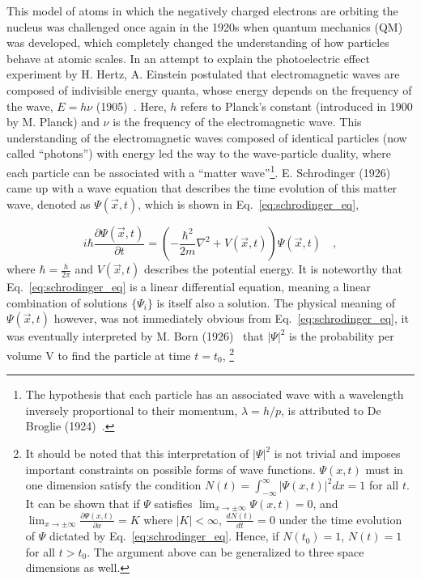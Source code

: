 This model of atoms in which the negatively charged electrons are orbiting the nucleus 
was challenged once again in the 1920s when quantum mechanics (QM) was developed, which completely 
changed the understanding of how particles behave at atomic scales. 
In an attempt to explain the photoelectric effect experiment by H. Hertz,
A. Einstein postulated that electromagnetic waves are composed of indivisible energy quanta, whose energy depends on the
frequency of the wave, $E = h\nu$ (1905)~\cite{Einstein:1905cc}. 
Here, $h$ refers to Planck's constant (introduced in 1900 by M. Planck) and $\nu$
is the frequency of the electromagnetic wave. This understanding of the electromagnetic waves composed of identical 
particles (now called ``photons'') with energy led the way to the wave-particle duality, 
where each particle can be associated with a 
``matter wave''\footnote{The hypothesis that each particle has an associated wave with a wavelength inversely
proportional to their momentum, $\lambda = h / p$, is attributed to De Broglie (1924)~\cite{deBroglie:1924ldk}.}. 
E. Schrodinger (1926)~\cite{Schrodinger:1926gei} 
came up with a wave equation that describes the time evolution of this matter wave, denoted as $\Psi(\vec{x}, t)$, 
which is shown in Eq.~\ref{eq:schrodinger_eq},

\begin{equation}
    i\hbar\frac{\partial \Psi(\vec{x}, t)}{\partial t} = \left(- \frac{\hbar^2}{2m}\nabla^2 + V(\vec{x}, t) \right)\Psi(\vec{x}, t) \quad ,
    \label{eq:schrodinger_eq}
\end{equation}
where $\hbar = \frac{h}{2\pi}$ and $V(\vec{x}, t)$ describes the potential energy. 
It is noteworthy that Eq.~\ref{eq:schrodinger_eq} is a linear differential equation,
meaning a linear combination of solutions $\{ \Psi_{i} \}$ is itself also a solution.
The physical meaning of $\Psi(\vec{x}, t)$ however,
was not immediately obvious from Eq.~\ref{eq:schrodinger_eq}, it was eventually interpreted by 
M. Born (1926)~\cite{Born:1926uzf}
that $|\Psi|^2$ is the probability per volume V to find the particle at time 
$t=t_{0}$,
\footnote{It should be noted that this interpretation of $|\Psi|^2$ is not trivial and imposes important constraints
on possible forms of wave functions. $\Psi(x,t)$ must in one dimension satisfy the condition 
$N(t) = \int_{-\infty}^{\infty} |\Psi(x,t)|^{2} dx = 1$ for all $t$.
It can be shown that if $\Psi$ satisfies $\lim_{x \rightarrow \pm \infty} \Psi(x,t) = 0$, and
$\lim_{x \rightarrow \pm \infty} \frac{\partial \Psi(x,t)}{\partial x} = K$ where $|K| < \infty$,
$\frac{dN(t)}{dt} = 0$ under the time evolution of $\Psi$ dictated by Eq.~\ref{eq:schrodinger_eq}. 
Hence, if $N(t_0) = 1$, $N(t) = 1$ for all $t > t_0$. The argument above
can be generalized to three space dimensions as well.}

